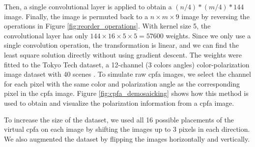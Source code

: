 Then, a single convolutional layer is applied to obtain a $(n/4)*(m/4)*144$ image.
Finally, the image is permuted back to a $n \times m \times 9$ image by reversing the operations in Figure \ref{fig:reorder_operations}.
With kernel size 5, the convolutional layer has only $144\times16\times5\times5=57600$ weights.
Since we only use a single convolution operation, the transformation is linear, and we can find the least square solution directly without using gradient descent.
The weights were fitted to the Tokyo Tech dataset, a 12-channel (3 colors  angles) color-polarization image dataset with 40 scenes \cite{morimatsuMonochromeColorPolarization2020}\cite{morimatsuMonochromeColorPolarization2021}.
To simulate raw \gls{cpfa} images, we select the channel for each pixel with the same color and polarization angle as the corresponding pixel in the \gls{cpfa} image.
Figure \ref{fig:cpfa_demosaicking} shows how this method is used to obtain and visualize the polarization information from a \gls{cpfa} image.

To increase the size of the dataset, we used all 16 possible placements of the virtual \gls{cpfa} on each image by shifting the images up to 3 pixels in each direction.
We also augmented the dataset by flipping the images horizontally and vertically.


